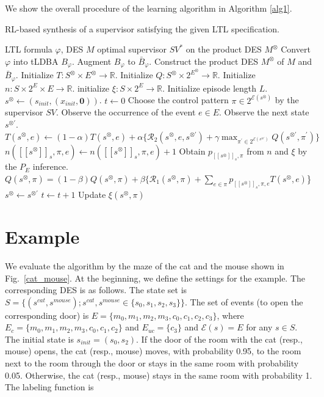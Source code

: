\documentclass[10 pt, dvipdfmx]{article}
\theoremstyle{definition}
\newcommand{\mysps}{\ensuremath{[\![s^{\otimes}]\!]}_s}
\newcommand{\myspq}{\ensuremath{[\![s^{\otimes}]\!]}_q}
\begin{document}
We show the overall procedure of the learning algorithm in Algorithm \ref{alg1}.

\begin{algorithm}[H]
 \caption{RL-based synthesis of a supervisor satisfying the given LTL specification.}
 \begin{algorithmic}[1]
 \renewcommand{\algorithmicrequire}{\textbf{Input:}}
 \renewcommand{\algorithmicensure}{\textbf{Output:}}
 \REQUIRE LTL formula $\varphi$, DES $M$
 \ENSURE  optimal supervisor $SV^{\ast}$ on the product DES $M^{\otimes}$
  \STATE Convert $\varphi$ into tLDBA $B_{\varphi}$.
  \STATE Augment $B_{\varphi}$ to $\bar{B}_{\varphi}$.
  \STATE Construct the product DES $M^{\otimes}$ of $M$ and $\bar{B}_{\varphi}$.
  \STATE Initialize $T:S^{\otimes} \times E^{\otimes} \rightarrow \mathbb{R}$.
  \STATE Initialize $Q:S^{\otimes} \times 2^{E^{\otimes}} \rightarrow \mathbb{R}$.
  \STATE Initialize $n:S \times 2^{E} \times E \rightarrow \mathbb{R}$.
  \STATE initialize $\xi:S \times 2^{E} \rightarrow \mathbb{R}$.
  \STATE Initialize episode length $L$.
  \STATE $s^{\otimes} \leftarrow (s_{init},(x_{init},\bm{0}))$.
  \STATE $t \leftarrow 0$
  \WHILE {$t <L$ and $\myspq \notin SinkSet$ }
  \STATE Choose the control pattern $\pi \in 2^{\mathcal{E}(s^{\otimes})}$ by the supervisor $SV$.
  \STATE Observe the occurrence of the event $e \in E$.
  \STATE Observe the next state $s^{\otimes \prime}$.
  \STATE $T(s^{\otimes},e) \leftarrow (1-\alpha)T(s^{\otimes},e) + \alpha \{\mathcal{R}_2(s^{\otimes},e,s^{\otimes \prime}) + \gamma \max_{\pi^{\prime} \in 2^{\mathcal{E}(s^{\otimes \prime})}}Q(s^{\otimes \prime},\pi^{\prime})\}$
  \STATE $n(\mysps, \pi, e) \leftarrow n(\mysps, \pi, e) + 1$
  \STATE Obtain $p_{\mysps,\pi}$ from $n$ and $\xi$ by the $P_E$ inference.
  \STATE $Q(s^{\otimes},\pi) = (1-\beta)Q(s^{\otimes},\pi) + \beta \{\mathcal{R}_1(s^{\otimes},\pi) + \sum_{e \in \pi} p_{\mysps,\pi,e} T(s^{\otimes},e)$\}
  \STATE $s^{\otimes} \leftarrow s^{\otimes \prime}$
  \STATE $t \leftarrow t + 1$
  \STATE Update $\xi(s^{\otimes}, \pi)$
  \ENDWHILE
  \ENDWHILE
 \end{algorithmic}
 \label{alg1}
 \end{algorithm}

\section{Example}
We evaluate the algorithm by the maze of the cat and the mouse shown in Fig.\ \ref{cat_mouse}. At the beginning, we define the settings for the example. The corresponding DES is as follows. The state set is $S = \{ (s^{cat}, s^{mouse}) ; s^{cat},s^{mouse} \in \{ s_0,s_1,s_2,s_3 \} \}$. The set of events (to open the corresponding door) is $E = \{ m_0, m_1, m_2, m_3, c_0, c_1, c_2, c_3 \}$, where $E_{c} = \{ m_0, m_1, m_2, m_3, c_0, c_1, c_2 \}$ and $E_{uc} = \{ c_3 \}$ and $\mathcal{E}(s) = E$ for any $s \in S$. The initial state is $s_{init} = (s_0, s_2)$. If the door of the room with the cat (resp., mouse) opens, the cat (resp., mouse) moves, with probability 0.95, to the room next to the room through the door or stays in the same room with probability 0.05. Otherwise, the cat (resp., mouse) stays in the same room with probability 1. The labeling function is
\end{document}
